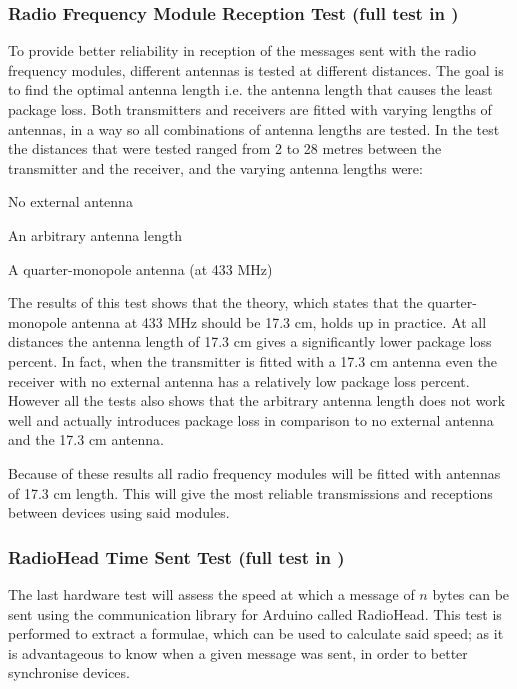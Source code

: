 \subsubsection*{Radio Frequency Module Reception Test (full test in )} %
\label{ssub:radio_frequency_module_reception_test}
To provide better reliability in reception of the messages sent with the radio frequency modules, different antennas is tested at different distances.
The goal is to find the optimal antenna length i.e. the antenna length that causes the least package loss.
Both transmitters and receivers are fitted with varying lengths of antennas, in a way so all combinations of antenna lengths are tested. 
In the test the distances that were tested ranged from 2 to 28 metres between the transmitter and the receiver, and the varying antenna lengths were:

\begin{description}[labelindent=\parindent, labelwidth=\widthof{\bfseries 17.3 cm}, align=parright]
    \item[0 cm] No external antenna
    \item[12 cm] An arbitrary antenna length
    \item[17.3 cm] A quarter-monopole antenna (at 433 MHz)
\end{description} 
\noindent
The results of this test shows that the theory, which states that the quarter-monopole antenna at 433 MHz should be 17.3 cm, holds up in practice.
At all distances the antenna length of 17.3 cm gives a significantly lower package loss percent.
In fact, when the transmitter is fitted with a 17.3 cm antenna even the receiver with no external antenna has a relatively low package loss percent.
However all the tests also shows that the arbitrary antenna length does not work well and actually introduces package loss in comparison to no external antenna and the 17.3 cm antenna.

Because of these results all radio frequency modules will be fitted with antennas of 17.3 cm length.
This will give the most reliable transmissions and receptions between devices using said modules.

\subsubsection*{RadioHead Time Sent Test (full test in )} %
\label{ssub:radiohead_time_sent_test}
The last hardware test will assess the speed at which a message of $n$ bytes can be sent using the communication library for Arduino called RadioHead.
This test is performed to extract a formulae, which can be used to calculate said speed; as it is advantageous to know when a given message was sent, in order to better synchronise devices.   

